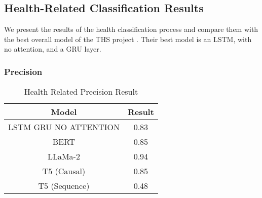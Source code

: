 %

\subsection{Health-Related Classification Results}
We present the results of the health classification process and compare them with the best overall model of the THS project \cite{8622504}.
Their best model is an LSTM, with no attention, and a GRU layer.

\subsubsection{Precision}
\begin{table}[htbp]
	\centering
	\caption{Health Related Precision Result}
	{\small
	\begin{tabular}{||c | c||} 
		\hline
		\textbf{Model} & \textbf{Result} \\ 
		\hline
		LSTM GRU NO ATTENTION & 0.83  \\
		\hline		
		BERT & 0.85  \\
		\hline
		LLaMa-2 & 0.94 \\ 
		\hline
		T5 (Causal) & 0.85 \\
		\hline
		T5 (Sequence) & 0.48 \\
		\hline
	\end{tabular}
	}
	\label{table:HealthPrecision}
\end{table}

